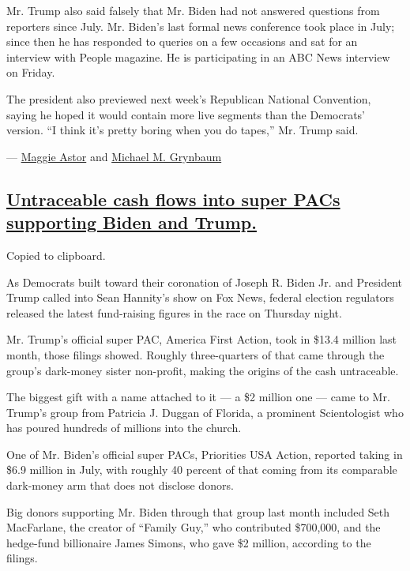 Mr. Trump also said falsely that Mr. Biden had not answered questions
from reporters since July. Mr. Biden's last formal news conference took
place in July; since then he has responded to queries on a few occasions
and sat for an interview with People magazine. He is participating in an
ABC News interview on Friday.

The president also previewed next week's Republican National Convention,
saying he hoped it would contain more live segments than the Democrats'
version. ``I think it's pretty boring when you do tapes,'' Mr. Trump
said.

--- \href{https://www.nytimes3xbfgragh.onion/by/maggie-astor}{Maggie
Astor} and
\href{https://www.nytimes3xbfgragh.onion/by/michael-m-grynbaum}{Michael
M. Grynbaum}

\hypertarget{untraceable-cash-flows-into-super-pacs-supporting-biden-and-trump}{%
\subsection{\texorpdfstring{\protect\hyperlink{untraceable-cash-flows-into-super-pacs-supporting-biden-and-trump}{Untraceable
cash flows into super PACs supporting Biden and
Trump.}}{Untraceable cash flows into super PACs supporting Biden and Trump.}}\label{untraceable-cash-flows-into-super-pacs-supporting-biden-and-trump}}

Copied to clipboard.

As Democrats built toward their coronation of Joseph R. Biden Jr. and
President Trump called into Sean Hannity's show on Fox News, federal
election regulators released the latest fund-raising figures in the race
on Thursday night.

Mr. Trump's official super PAC, America First Action, took in \$13.4
million last month, those filings showed. Roughly three-quarters of that
came through the group's dark-money sister non-profit, making the
origins of the cash untraceable.

The biggest gift with a name attached to it --- a \$2 million one ---
came to Mr. Trump's group from Patricia J. Duggan of Florida, a
prominent Scientologist who has poured hundreds of millions into the
church.

One of Mr. Biden's official super PACs, Priorities USA Action, reported
taking in \$6.9 million in July, with roughly 40 percent of that coming
from its comparable dark-money arm that does not disclose donors.

Big donors supporting Mr. Biden through that group last month included
Seth MacFarlane, the creator of ``Family Guy,'' who contributed
\$700,000, and the hedge-fund billionaire James Simons, who gave \$2
million, according to the filings.

